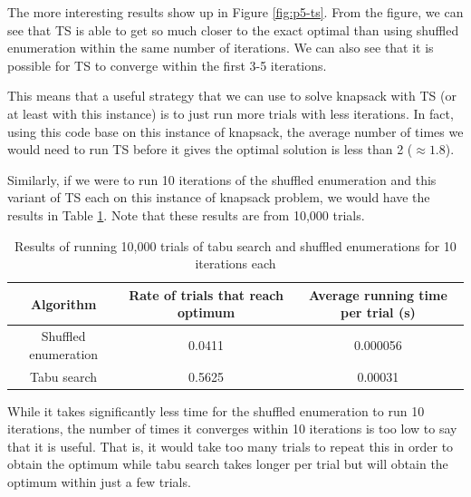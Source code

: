 The more interesting results show up in Figure \ref{fig:p5-ts}. From the figure, we can see that TS is able to get so much closer to the exact optimal than using shuffled enumeration within the same number of iterations. We can also see that it is possible for TS to converge within the first 3-5 iterations.

This means that a useful strategy that we can use to solve knapsack with TS (or at least with this instance) is to just run more trials with less iterations. In fact, using this code base on this instance of knapsack, the average number of times we would need to run TS before it gives the optimal solution is less than 2 (\(\approx 1.8\)).

Similarly, if we were to run 10 iterations of the shuffled enumeration and this variant of TS each on this instance of knapsack problem, we would have the results in Table \ref{table:p5}. Note that these results are from 10,000 trials.
\begin{table}
    \centering
    \begin{tabular}{c c c}
        \toprule
        Algorithm & Rate of trials that reach optimum & Average running time per trial (s) \\
        \midrule
        Shuffled enumeration & 0.0411 & 0.000056 \\
        Tabu search & 0.5625 & 0.00031 \\
        \bottomrule
    \end{tabular}
    \caption{Results of running 10,000 trials of tabu search and shuffled enumerations for 10 iterations each}
    \label{table:p5}
\end{table}
While it takes significantly less time for the shuffled enumeration to run 10 iterations, the number of times it converges within 10 iterations is too low to say that it is useful. That is, it would take too many trials to repeat this in order to obtain the optimum while tabu search takes longer per trial but will obtain the optimum within just a few trials.
